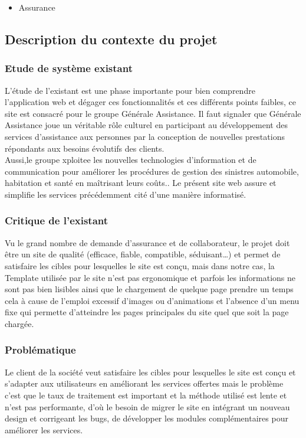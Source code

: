 \documentclass{article}
\begin{document}
\begin{itemize}
\item Assurance
\end{itemize}
\cleardoublepage
\subsection{Description du contexte du projet}
\subsubsection{Etude de système existant}
L’étude de l’existant est une phase importante pour bien comprendre l'application web et dégager ces fonctionnalités et ces différents points faibles, ce site est consacré pour le groupe Générale Assistance. Il faut signaler que Générale Assistance joue un véritable rôle culturel en participant au développement des services d’assistance aux personnes par la conception de nouvelles prestations répondants aux besoins évolutifs des clients.\\
Aussi,le groupe xploitee les nouvelles technologies d’information et de communication pour améliorer les procédures de gestion des sinistres automobile, habitation et santé en maîtrisant leurs coûts.. Le présent site web assure et simplifie les services précédemment cité d’une manière informatisé.
\subsubsection{Critique de l’existant}
Vu le grand nombre de demande d'assurance et de collaborateur, le projet doit être un site de qualité (efficace, fiable, compatible, séduisant…) et permet de satisfaire les cibles pour lesquelles le site est conçu, mais dans notre cas, la Template utilisée par le site n’est pas ergonomique et parfois les informations ne sont pas bien lisibles ainsi que le chargement de quelque page prendre un temps cela à cause de l'emploi excessif d'images ou d'animations et l’absence d’un menu fixe qui permette d'atteindre les pages principales du site quel que soit la page chargée.
\subsubsection{Problématique}
Le client de la société veut satisfaire les cibles pour lesquelles le site est conçu et s’adapter aux utilisateurs en améliorant les services offertes mais le problème c’est que le taux de traitement est important et la méthode utilisé est lente et n'est pas performante, d’où le besoin de migrer le site en intégrant un nouveau design et corrigeant les bugs, de développer les modules complémentaires pour améliorer les services.
\end{document}
